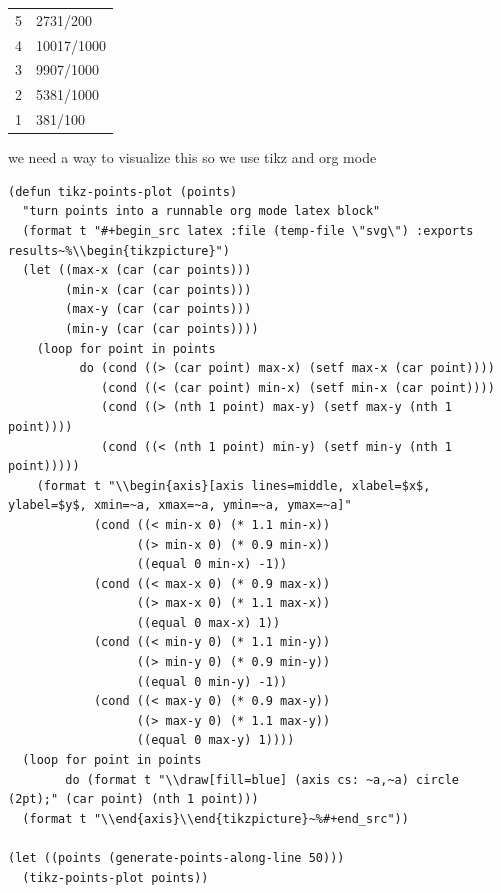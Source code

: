 \documentclass[a4paper,12pt]{article}
\begin{document}
\begin{tabular}{rl}
5 & 2731/200\\
4 & 10017/1000\\
3 & 9907/1000\\
2 & 5381/1000\\
1 & 381/100\\
\end{tabular}

we need a way to visualize this so we use tikz and org mode\\
\lstset{language=Lisp,label= ,caption= ,captionpos=b,numbers=none}
\begin{lstlisting}
(defun tikz-points-plot (points)
  "turn points into a runnable org mode latex block"
  (format t "#+begin_src latex :file (temp-file \"svg\") :exports results~%\\begin{tikzpicture}")
  (let ((max-x (car (car points)))
        (min-x (car (car points)))
        (max-y (car (car points)))
        (min-y (car (car points))))
    (loop for point in points
          do (cond ((> (car point) max-x) (setf max-x (car point))))
             (cond ((< (car point) min-x) (setf min-x (car point))))
             (cond ((> (nth 1 point) max-y) (setf max-y (nth 1 point))))
             (cond ((< (nth 1 point) min-y) (setf min-y (nth 1 point)))))
    (format t "\\begin{axis}[axis lines=middle, xlabel=$x$, ylabel=$y$, xmin=~a, xmax=~a, ymin=~a, ymax=~a]"
            (cond ((< min-x 0) (* 1.1 min-x))
                  ((> min-x 0) (* 0.9 min-x))
                  ((equal 0 min-x) -1))
            (cond ((< max-x 0) (* 0.9 max-x))
                  ((> max-x 0) (* 1.1 max-x))
                  ((equal 0 max-x) 1))
            (cond ((< min-y 0) (* 1.1 min-y))
                  ((> min-y 0) (* 0.9 min-y))
                  ((equal 0 min-y) -1))
            (cond ((< max-y 0) (* 0.9 max-y))
                  ((> max-y 0) (* 1.1 max-y))
                  ((equal 0 max-y) 1))))
  (loop for point in points
        do (format t "\\draw[fill=blue] (axis cs: ~a,~a) circle (2pt);" (car point) (nth 1 point)))
  (format t "\\end{axis}\\end{tikzpicture}~%#+end_src"))

(let ((points (generate-points-along-line 50)))
  (tikz-points-plot points))
\end{lstlisting}

\\
\end{document}
